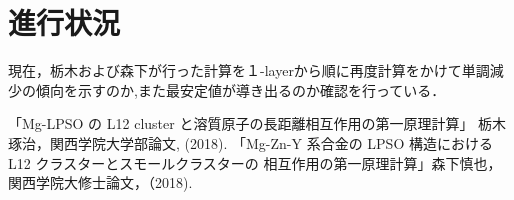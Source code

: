 \documentclass[a4j,twocolumn]{jsarticle}
\begin{document}
\section{進行状況}
現在，栃木および森下が行った計算を１-layerから順に再度計算をかけて単調減少の傾向を示すのか,また最安定値が導き出るのか確認を行っている．


\vspace{0.5\baselineskip}

{\small\setlength\baselineskip{10pt}	%
\begin{thebibliography}{9}
「Mg-LPSO の L12 cluster と溶質原子の長距離相互作用の第一原理計算」 栃木琢治，関西学院大学部論文, (2018).
 「Mg-Zn-Y 系合金の LPSO 構造における L12 クラスターとスモールクラスターの 相互作用の第一原理計算」森下慎也，関西学院大修士論文，（2018).

\end{thebibliography}
}
\end{document}
